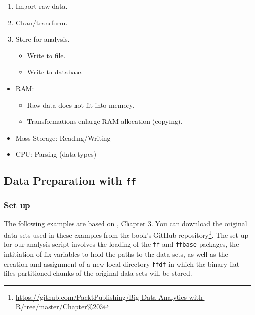 \documentclass[
  12pt,
]{style/krantz}
\providecommand{\tightlist}{%
  \setlength{\itemsep}{0pt}\setlength{\parskip}{0pt}}
\renewcommand{\href}[2]{#2\footnote{\url{#1}}}
\begin{document}
\begin{enumerate}
\def\labelenumi{\arabic{enumi}.}
\tightlist
\item
  Import raw data.
\item
  Clean/transform.
\item
  Store for analysis.

  \begin{itemize}
  \tightlist
  \item
    Write to file.
  \item
    Write to database.
  \end{itemize}
\end{enumerate}

\begin{itemize}
\tightlist
\item
  RAM:

  \begin{itemize}
  \tightlist
  \item
    Raw data does not fit into memory.
  \item
    Transformations enlarge RAM allocation (copying).
  \end{itemize}
\item
  Mass Storage: Reading/Writing
\item
  CPU: Parsing (data types)
\end{itemize}

\hypertarget{data-preparation-with-ff}{%
\subsection{\texorpdfstring{Data Preparation with \texttt{ff}}{Data Preparation with ff}}\label{data-preparation-with-ff}}

\hypertarget{set-up}{%
\subsubsection{Set up}\label{set-up}}

The following examples are based on \citet{walkowiak_2016}, Chapter 3. You can download the original data sets used in these examples from \href{https://github.com/PacktPublishing/Big-Data-Analytics-with-R/tree/master/Chapter\%203}{the book's GitHub repository}. The set up for our analysis script involves the loading of the \texttt{ff} and \texttt{ffbase} packages, the intitiation of fix variables to hold the paths to the data sets, as well as the creation and assignment of a new local directory \texttt{ffdf} in which the binary flat files-partitioned chunks of the original data sets will be stored.
\end{document}
